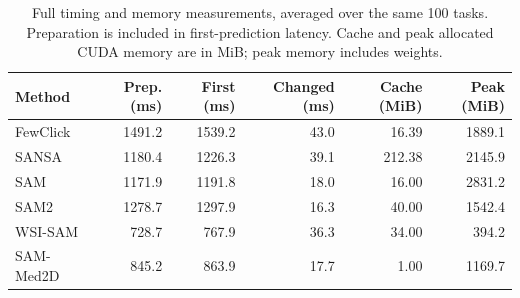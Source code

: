 \begin{table}[t]
\centering
\caption{Full timing and memory measurements, averaged over the same 100 tasks. Preparation is included in first-prediction latency. Cache and peak allocated CUDA memory are in MiB; peak memory includes weights.}
\label{tab:patchtime}
\small
\setlength{\tabcolsep}{4pt}
\begin{tabular}{@{}lrrrrr@{}}
\toprule
Method & Prep. (ms) & First (ms) & Changed (ms) & Cache (MiB) & Peak (MiB) \\
\midrule
FewClick & 1491.2 & 1539.2 & 43.0 & 16.39 & 1889.1 \\
SANSA & 1180.4 & 1226.3 & 39.1 & 212.38 & 2145.9 \\
SAM & 1171.9 & 1191.8 & 18.0 & 16.00 & 2831.2 \\
SAM2 & 1278.7 & 1297.9 & 16.3 & 40.00 & 1542.4 \\
WSI-SAM & 728.7 & 767.9 & 36.3 & 34.00 & 394.2 \\
SAM-Med2D & 845.2 & 863.9 & 17.7 & 1.00 & 1169.7 \\
\bottomrule
\end{tabular}
\end{table}
